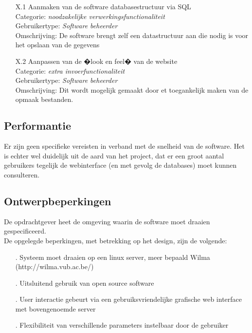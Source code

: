 \documentclass{article}
\begin{document}
\begin{itemize}
\item[X.1] Aanmaken van de software databasestructuur via SQL \\
Categorie: \textit{noodzakelijke verwerkingsfunctionaliteit} \\
Gebruikertype: \textit{Software beheerder} \\
Omschrijving: De software brengt zelf een datastructuur aan die nodig is voor het opslaan van de gegevens  \\[-3mm]

\item[X.2] Aanpassen van de �look en feel� van de website \\
Categorie: \textit{extra invoerfunctionaliteit} \\
Gebruikertype: \textit{Software beheerder} \\
Omschrijving: Dit wordt mogelijk gemaakt door et toegankelijk maken van de opmaak bestanden. \\[-3mm]
\end{itemize}


\subsection{Performantie}

Er zijn geen specifieke vereisten in verband met de snelheid van de software. Het is echter wel duidelijk uit de aard van het project, dat er een groot aantal gebruikers tegelijk de webinterface (en met gevolg de databases) moet kunnen consulteren.

\subsection{Ontwerpbeperkingen}

De opdrachtgever heet de omgeving waarin de software moet draaien gespecificeerd.\\
De opgelegde beperkingen, met betrekking op het design, zijn de volgende:

\begin{itemize}
\item[.] Systeem moet draaien op een linux server, meer bepaald Wilma (http://wilma.vub.ac.be/) \\[-5mm]
\item[.] Uitsluitend gebruik van open source software \\[-5mm]
\item[.] User interactie gebeurt via een gebruiksvriendelijke grafische web interface met bovengenoemde server \\[-5mm]
\item[.] Flexibiliteit van verschillende parameters instelbaar door de gebruiker \\[-5mm]
\end{itemize}
\end{document}
